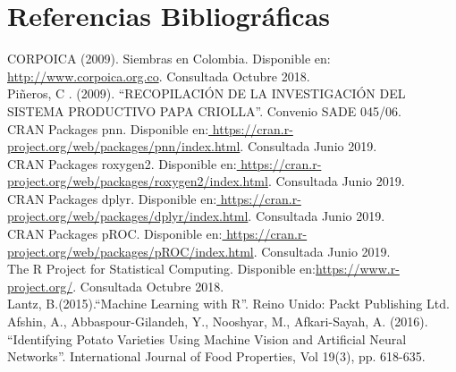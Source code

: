 
\chapter*{Referencias Bibliográficas}

\noindent
CORPOICA (2009). Siembras en Colombia. Disponible en:\url{ http://www.corpoica.org.co}. Consultada Octubre 2018.\\

\noindent
Piñeros, C . (2009). "`RECOPILACIÓN DE LA INVESTIGACIÓN DEL SISTEMA PRODUCTIVO PAPA CRIOLLA"'. Convenio SADE 045/06.\\

\noindent
CRAN Packages pnn. Disponible en:\url{ https://cran.r-project.org/web/packages/pnn/index.html}. Consultada Junio 2019.\\

\noindent
CRAN Packages roxygen2. Disponible en:\url{ https://cran.r-project.org/web/packages/roxygen2/index.html}. Consultada Junio 2019.\\

\noindent
CRAN Packages dplyr. Disponible en:\url{ https://cran.r-project.org/web/packages/dplyr/index.html}. Consultada Junio 2019.\\

\noindent
CRAN Packages pROC. Disponible en:\url{ https://cran.r-project.org/web/packages/pROC/index.html}. Consultada Junio 2019.\\

\noindent
The R Project for Statistical Computing. Disponible en:\url{https://www.r-project.org/}. Consultada Octubre 2018.\\

\noindent
Lantz, B.(2015)."`Machine Learning with R"'. Reino Unido: Packt Publishing Ltd. \\

\noindent
Afshin, A., Abbaspour-Gilandeh, Y., Nooshyar, M., Afkari-Sayah, A. (2016). "`Identifying Potato Varieties Using Machine Vision and Artificial Neural Networks"'. International Journal of Food Properties, Vol 19(3), pp. 618-635. \\

